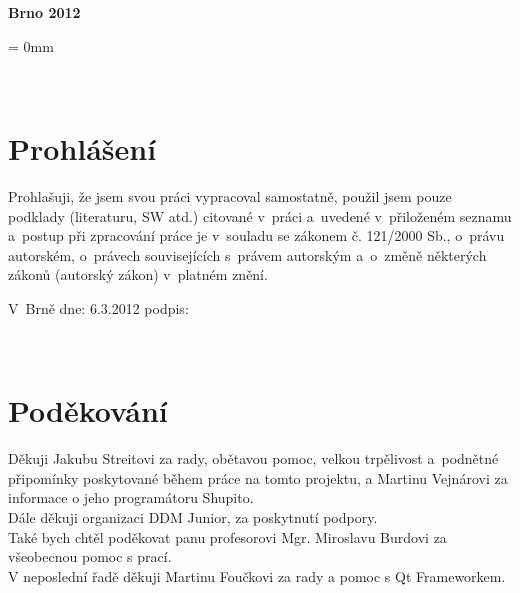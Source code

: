 \documentclass[12pt, a4paper, oneside]{article}
\newcommand{\B}{\textbf} %
\begin{document}
\vspace{20mm}

\begin{center}
\B{Brno 2012}

\end{center}
\normalsize
\newpage  %
\voffset = 0mm %

~ %

\vspace{10mm}

\section*{Prohlášení}

Prohlašuji, že jsem svou práci vypracoval samostatně, použil jsem pouze 
podklady (literaturu, SW atd.) citované v~práci a~uvedené v~přiloženém seznamu 
a~postup při zpracování práce je v~souladu se zákonem č. 121/2000 Sb., o~právu 
autorském, o~právech souvisejících s~právem autorským a~o~změně některých 
zákonů (autorský zákon) v~platném znění. 
 
\vspace{20mm} 
 
\noindent V~Brně  dne: 6.3.2012 \hspace{50mm}                 podpis:   
 

\newpage   %

~ %

\vspace{120mm}

\section*{Poděkování}

 Děkuji Jakubu Streitovi za rady, obětavou pomoc, velkou trpělivost a~podnětné připomínky poskytované během práce na tomto projektu, a Martinu Vejnárovi za informace o jeho programátoru Shupito.\\%
 Dále děkuji organizaci DDM Junior, za poskytnutí podpory.\\
 Také bych chtěl poděkovat panu profesorovi Mgr. Miroslavu Burdovi za všeobecnou pomoc s prací.\\
 V neposlední řadě děkuji Martinu Foučkovi za rady a pomoc s Qt Frameworkem.
\end{document}
